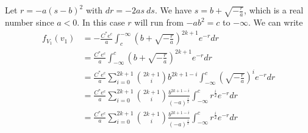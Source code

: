\documentclass[11pt]{article} %
\begin{document}
Let $r = -a(s - b)^2$ with $dr = -2a s \: ds $. We have $s = b + \sqrt{-\frac{r}{a}}$, which is a real number since $a<0$. In this case $r$ will run from $-ab^2 = c$ to $-\infty$. We can write
\begin{align*}
f_{V_1}(v_1) &= - \frac{C^* e^c}{a} \int_{c}^{-\infty}\left(b + \sqrt{-\frac{r}{a}}\right)^ {2k+1} e^{-r } dr \\
 &=  \frac{C^* e^c}{a} \int_{-\infty}^{c}\left(b + \sqrt{-\frac{r}{a}}\right)^ {2k+1} e^{-r } dr \\
 &=  \frac{C^* e^c}{a} \sum_{i = 0}^{2k + 1} {2k + 1 \choose i}b^{2k+1-i}\int_{-\infty}^{c}\left(\sqrt{-\frac{r}{a}}\right)^ {i} e^{-r } dr \\
 &=  \frac{C^* e^c}{a} \sum_{i = 0}^{2k + 1} {2k + 1 \choose i}\frac{b^{2k+1-i}}{(-a)^{\frac{i}2}}\int_{-\infty}^{c}r^{\frac{i}2} e^{-r } dr \\
 &=  \frac{C^* e^c}{a} \sum_{i = 0}^{2k + 1} {2k + 1 \choose i}\frac{b^{2k+1-i}}{(-a)^{\frac{i}2}}\int_{-\infty}^{c}r^{\frac{i}2} e^{-r } dr \\
\end{align*}
\end{document}
